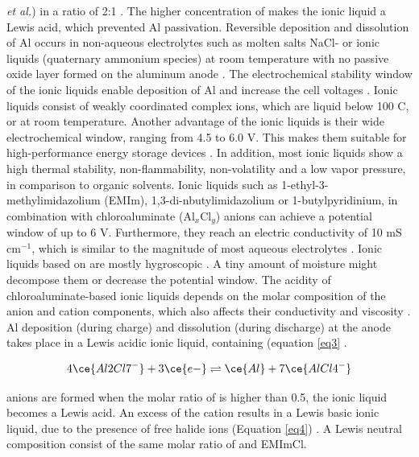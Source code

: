 \textit{et al.}) in a ratio of 2:1 \cite{gifford_aluminum/chlorine_1988-1}. The higher concentration of  makes the ionic liquid a Lewis acid, which prevented Al passivation. 
Reversible deposition and dissolution of Al occurs in non-aqueous electrolytes such as molten salts NaCl- or ionic liquids (quaternary ammonium species) at room temperature with no passive oxide layer formed on the aluminum anode \cite{vestergaard_molten_1993,galinski_ionic_2006,elia_insights_2017}. The electrochemical stability window of the ionic liquids enable deposition of Al and increase the cell voltages \cite{li_aluminum_2002}. Ionic liquids consist of weakly coordinated complex ions, which are liquid below 100 C, or at room temperature. Another advantage of the ionic liquids is their wide electrochemical window, ranging from 4.5 to 6.0 V. This makes them suitable for high-performance energy storage devices \cite{wang_binder-free_2015}. In addition, most ionic liquids show a high thermal stability, non-flammability, non-volatility and a low vapor pressure, in comparison to organic solvents. Ionic liquids such as 1-ethyl-3-methylimidazolium (EMIm), 1,3-di-nbutylimidazolium or 1-butylpyridinium, in combination with chloroaluminate (Al$_x$Cl$_y$) anions can achieve a potential window of up to 6 V. Furthermore, they reach an electric conductivity of 10 mS cm$^{−1}$, which is similar to the magnitude of most aqueous electrolytes \cite{ngo_thermal_2000}. Ionic liquids based on   are mostly hygroscopic \cite{ueda_electroplating_2012}. A tiny amount of moisture might decompose them or decrease the potential window. The acidity of chloroaluminate-based ionic liquids depends on the molar composition of the anion and cation components, which also affects their conductivity and viscosity \cite{buzzeo_non-haloaluminate_2004}. 
Al deposition (during charge) and dissolution (during discharge) at the anode takes place in a Lewis acidic ionic liquid, containing  (equation \ref{eq3} \cite{galinski_ionic_2006}.

\begin{align} \label{eq3}
   4\ce{Al2Cl7^{-}} + 3\ce{e-} \rightleftharpoons \ce{Al} + 7\ce{AlCl4^{-}}  
\end{align}

 anions are formed when the molar ratio of  is higher than 0.5, the ionic liquid becomes a Lewis acid. An excess of the cation results in a Lewis basic ionic liquid, due to the presence of free halide ions (Equation \ref{eq4}) \cite{holbrey_ionic_1999}. A Lewis neutral composition consist of the same molar ratio of  and EMImCl. 

